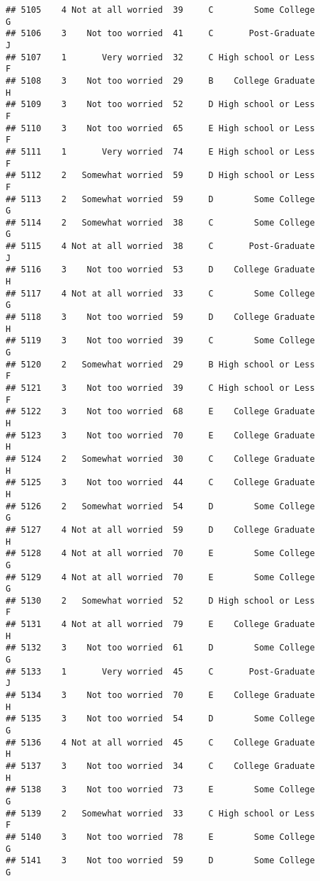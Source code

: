 \documentclass[
]{article}
\begin{document}
\begin{verbatim}
## 5105    4 Not at all worried  39     C        Some College         G
## 5106    3    Not too worried  41     C       Post-Graduate         J
## 5107    1       Very worried  32     C High school or Less         F
## 5108    3    Not too worried  29     B    College Graduate         H
## 5109    3    Not too worried  52     D High school or Less         F
## 5110    3    Not too worried  65     E High school or Less         F
## 5111    1       Very worried  74     E High school or Less         F
## 5112    2   Somewhat worried  59     D High school or Less         F
## 5113    2   Somewhat worried  59     D        Some College         G
## 5114    2   Somewhat worried  38     C        Some College         G
## 5115    4 Not at all worried  38     C       Post-Graduate         J
## 5116    3    Not too worried  53     D    College Graduate         H
## 5117    4 Not at all worried  33     C        Some College         G
## 5118    3    Not too worried  59     D    College Graduate         H
## 5119    3    Not too worried  39     C        Some College         G
## 5120    2   Somewhat worried  29     B High school or Less         F
## 5121    3    Not too worried  39     C High school or Less         F
## 5122    3    Not too worried  68     E    College Graduate         H
## 5123    3    Not too worried  70     E    College Graduate         H
## 5124    2   Somewhat worried  30     C    College Graduate         H
## 5125    3    Not too worried  44     C    College Graduate         H
## 5126    2   Somewhat worried  54     D        Some College         G
## 5127    4 Not at all worried  59     D    College Graduate         H
## 5128    4 Not at all worried  70     E        Some College         G
## 5129    4 Not at all worried  70     E        Some College         G
## 5130    2   Somewhat worried  52     D High school or Less         F
## 5131    4 Not at all worried  79     E    College Graduate         H
## 5132    3    Not too worried  61     D        Some College         G
## 5133    1       Very worried  45     C       Post-Graduate         J
## 5134    3    Not too worried  70     E    College Graduate         H
## 5135    3    Not too worried  54     D        Some College         G
## 5136    4 Not at all worried  45     C    College Graduate         H
## 5137    3    Not too worried  34     C    College Graduate         H
## 5138    3    Not too worried  73     E        Some College         G
## 5139    2   Somewhat worried  33     C High school or Less         F
## 5140    3    Not too worried  78     E        Some College         G
## 5141    3    Not too worried  59     D        Some College         G

\end{verbatim}
\end{document}
